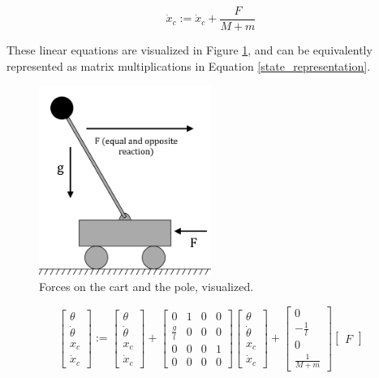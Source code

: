 \documentclass[11pt]{article}
\begin{document}
\begin{equation}
    \dot x _c := \displaystyle \dot x _c + \frac{\displaystyle F}{\displaystyle M + m}
\end{equation}

These linear equations are visualized in Figure \ref{arrows}, and can be equivalently represented as matrix multiplications in Equation \ref{state_representation}.

\begin{figure}[ht]
    \centering
    \includegraphics[width=0.5\textwidth]{arrows}
    \caption{\label{arrows} Forces on the cart and the pole, visualized.}
\end{figure}

\begin{equation} \label{state_representation}
    \displaystyle
    \begin{bmatrix}
        \theta \\
        \dot \theta \\
        x _c \\
        \dot x _c
    \end{bmatrix}
    := \begin{bmatrix}
        \theta \\
        \dot \theta \\
        x _c \\
        \dot x _c
    \end{bmatrix}
    + \begin{bmatrix}
        0 & 1 & 0 & 0 \\
        \frac{g}{l} & 0 & 0 & 0 \\
        0 & 0 & 0 & 1 \\
        0 & 0 & 0 & 0
    \end{bmatrix}
    \begin{bmatrix}
        \theta \\
        \dot \theta \\
        x _c \\
        \dot x _c
    \end{bmatrix}
    + \begin{bmatrix}
        0 \\
        - \frac{1}{l} \\
        0 \\
        \frac{1}{M + m}
    \end{bmatrix}
    \begin{bmatrix}
        F
    \end{bmatrix}
\end{equation}
\end{document}
